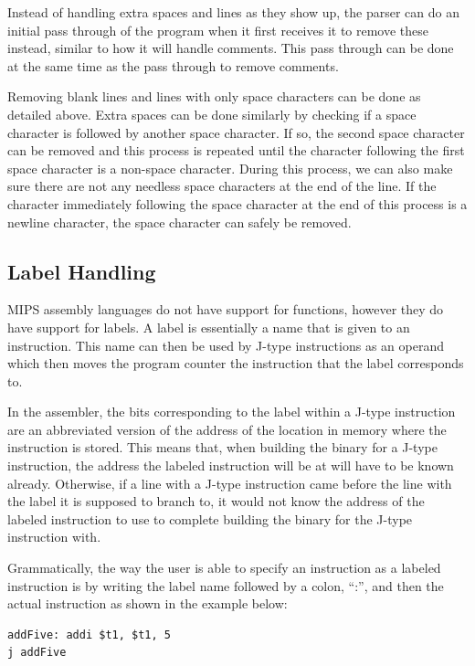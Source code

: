 \documentclass[
    parskip=half,
    fontsize=12pt,
    titlepage=firstiscover,
    toc=bibliography,
    numbers=endperiod
]{scrartcl}
\begin{document}
Instead of handling extra spaces and lines as they show up, the parser
can do an initial pass through of the program when it first receives it
to remove these instead, similar to how it will handle comments. This
pass through can be done at the same time as the pass through to remove
comments.

Removing blank lines and lines with only space characters can be done as
detailed above. Extra spaces can be done similarly by checking if a
space character is followed by another space character. If so, the
second space character can be removed and this process is repeated until
the character following the first space character is a non-space
character. During this process, we can also make sure there are not any
needless space characters at the end of the line. If the character
immediately following the space character at the end of this process is
a newline character, the space character can safely be removed.

\subsection{Label Handling}

MIPS assembly languages do not have support for functions, however they
do have support for labels. A label is essentially a name that is given
to an instruction. This name can then be used by J-type instructions as
an operand which then moves the program counter the instruction that the
label corresponds to.

In the assembler, the bits corresponding to the label within a J-type
instruction are an abbreviated version of the address of the location in
memory where the instruction is stored. This means that, when building
the binary for a J-type instruction, the address the labeled instruction
will be at will have to be known already. Otherwise, if a line with a
J-type instruction came before the line with the label it is supposed to
branch to, it would not know the address of the labeled instruction to
use to complete building the binary for the J-type instruction with.

Grammatically, the way the user is able to specify an instruction as a
labeled instruction is by writing the label name followed by a colon,
``:'', and then the actual instruction as shown in the example below:

\begin{verbatim}
addFive: addi $t1, $t1, 5
j addFive
\end{verbatim}
\end{document}
